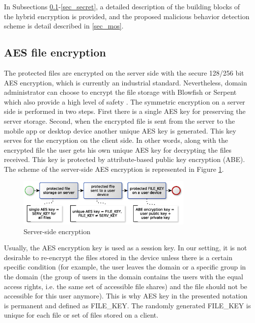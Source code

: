 \documentclass[twocolumn]{svjour3}          	%
\begin{document}
In Subsections \ref{sec_aes}-\ref{sec_secret}, a detailed description of the building blocks of the hybrid encryption is provided, and the proposed malicious behavior detection scheme is detail described in \ref{sec_mos}.

\subsection{AES file encryption }
\label{sec_aes}
The protected files are encrypted on the server side with the secure 128/256 bit AES encryption, which is currently an industrial standard. Nevertheless, domain administrator can choose to encrypt the file storage with Blowfish or Serpent which also provide a high level of safety \cite{nist2000}. The symmetric encryption on a server side is performed in two steps. First there is a single AES key for preserving the server storage. Second, when the encrypted file is sent from the server to the mobile app or desktop device another unique AES key is generated. This key serves for the encryption on the client side. In other words, along with the encrypted file the user gets his own unique AES key for decrypting the files received. This key is protected by attribute-based public key encryption (ABE). The scheme of the server-side AES encryption is represented in Figure \ref{fig:11}.

\begin{figure}[h!]
	\centering
	\includegraphics[width=8.6cm]{figures/server-sideencryption.eps}
	\caption{Server-side encryption}
	\label{fig:11}
\end{figure}

Usually, the AES encryption key is used as a session key. In our setting, it is not desirable to re-encrypt the files stored in the device unless there is a certain specific condition (for example, the user leaves the domain or a specific group in the domain (the group of users in the domain contains the users with the equal access rights, i.e. the same set of accessible file shares) and the file should not be accessible for this user anymore). This is why AES key in the presented notation is permanent and defined as FILE\_KEY. The randomly generated FILE\_KEY is unique for each file or set of files stored on a client. 
\end{document}

